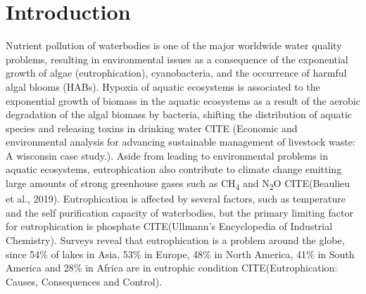 \documentclass[10pt,a4paper]{article}
\begin{document}
\section{Introduction}
Nutrient pollution of waterbodies is one of the major worldwide water quality problems, resulting in environmental issues as a consequence of the exponential growth of algae (eutrophication), cyanobacteria, and the occurrence of harmful algal blooms (HABs). Hypoxia of aquatic ecosystems is associated to the exponential growth of biomass in the aquatic ecosystems as a result of the aerobic degradation of the algal biomass by bacteria, shifting the distribution of aquatic species and releasing toxins in drinking water CITE (Economic and environmental analysis for advancing sustainable management of livestock waste: A wisconsin case study.). Aside from leading to environmental problems in aquatic ecosystems, eutrophication also contribute to climate change emitting large amounts of strong greenhouse gases such as CH\textsubscript{4} and N\textsubscript{2}O CITE(Beaulieu et al., 2019). Eutrophication is affected by several factors, such as temperature and the self purification capacity of waterbodies, but the primary limiting factor for eutrophication is phosphate CITE(Ullmann's Encyclopedia of Industrial Chemistry). Surveys reveal that eutrophication is a problem around the globe, since 54\% of lakes in Asia, 53\% in Europe, 48\% in North America, 41\% in South America and 28\% in Africa are in eutrophic condition CITE(Eutrophication: Causes, Consequences and Control).
\end{document}
